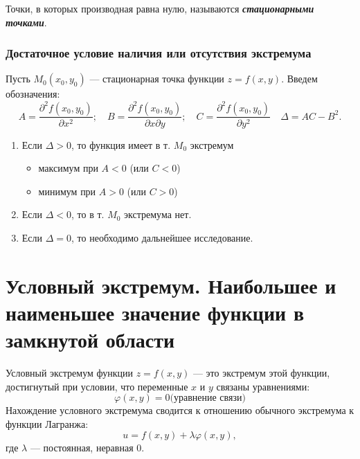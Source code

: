\documentclass[a4paper,12pt,oneside]{extbook}
\theoremstyle{numbered}
\theoremstyle{unnumbered}
\theoremstyle{named}
\theoremstyle{unnumbered}
\theoremstyle{named}
\theoremstyle{named}
\theoremstyle{named}
\begin{document}
Точки, в которых производная равна нулю, называются \textbf{\textit{стационарными точками}}.

\subsubsection{Достаточное условие наличия или отсутствия экстремума}%
\label{ssub:Достаточное условие наличия или отсутствия экстремума}

Пусть \(M_0(x_0, y_0)\) — стационарная точка функции \(z = f(x, y)\). Введем обозначения:
\begin{equation}
    A = \frac{\partial^2 f(x_0, y_0)}{\partial x^2}; \quad B = \frac{\partial^2 f(x_0, y_0)}{\partial x \partial y}; \quad C = \frac{\partial^2 f(x_0, y_0)}{\partial y^2} \quad \Delta = AC - B^2.
\end{equation}

\begin{enumerate}
    \item {
          Если \(\Delta > 0\), то функция имеет в т. \(M_0\) экстремум
          \begin{itemize}
              \item {максимум при \(A < 0\) (или \(C < 0\))}
              \item {минимум при \(A > 0\) (или \(C > 0\))}
          \end{itemize}
          }
    \item {Если \(\Delta < 0\), то в т. \(M_0\) экстремума нет.}
    \item {Если \(\Delta = 0\), то необходимо дальнейшее исследование.}
\end{enumerate}

\section{Условный экстремум. Наибольшее и наименьшее значение функции в замкнутой области}%
\label{sec:Условный экстремум. Наибольшее и наименьшее значение функции в замкнутой области}

Условный экстремум функции \(z = f(x, y)\) — это экстремум этой функции, достигнутый при условии, что переменные \(x\) и \(y\) связаны уравнениями:
\begin{equation}
    \varphi(x, y) = 0 \text{(уравнение связи)}
\end{equation}
Нахождение условного экстремума сводится к отношению обычного экстремума к функции Лагранжа:
\begin{equation}
    u = f(x, y) + \lambda \varphi(x, y),
\end{equation}
где \(\lambda\) — постоянная, неравная 0.
\end{document}
